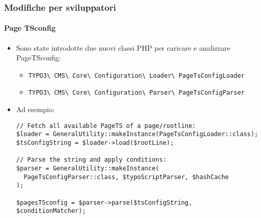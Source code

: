 
\begin{frame}[fragile]
	\frametitle{Modifiche per sviluppatori}
	\framesubtitle{Page TSconfig}

	\lstset{basicstyle=\tiny\ttfamily}

	\begin{itemize}
		\item Sono state introdotte due nuovi classi PHP per caricare e analizzare PageTSconfig:
			\begin{itemize}\smaller
				\item \texttt{TYPO3\textbackslash
					CMS\textbackslash
					Core\textbackslash
					Configuration\textbackslash
					Loader\textbackslash
					PageTsConfigLoader}
				\item \texttt{TYPO3\textbackslash
					CMS\textbackslash
					Core\textbackslash
					Configuration\textbackslash
					Parser\textbackslash
					PageTsConfigParser}
			\end{itemize}

		\item Ad esempio:
\begin{lstlisting}
// Fetch all available PageTS of a page/rootline:
$loader = GeneralUtility::makeInstance(PageTsConfigLoader::class);
$tsConfigString = $loader->load($rootLine);

// Parse the string and apply conditions:
$parser = GeneralUtility::makeInstance(
  PageTsConfigParser::class, $typoScriptParser, $hashCache
);

$pagesTSconfig = $parser->parse($tsConfigString, $conditionMatcher);
\end{lstlisting}

	\end{itemize}

\end{frame}


